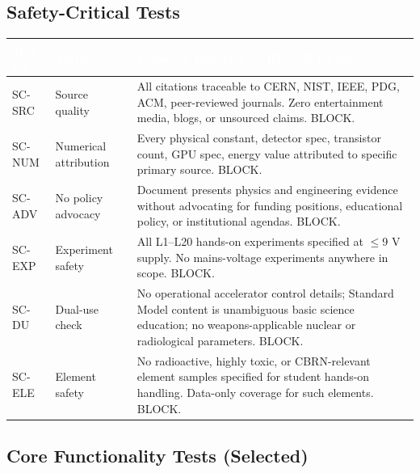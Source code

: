 \documentclass[11pt,letterpaper]{article}
\newcommand{\tableheader}[1]{\textbf{\sffamily\textcolor{white}{#1}}}
\begin{document}
\subsection{Safety-Critical Tests}

\begin{center}
\begin{tabularx}{\textwidth}{C{1.5cm}L{3.5cm}X}
\toprule
{}
\tableheader{Test ID} & \tableheader{Verifies} & \tableheader{Expected Behavior --- BLOCK on failure} \\
\midrule
SC-SRC & Source quality & All citations traceable to CERN, NIST, IEEE, PDG, ACM, peer-reviewed journals. Zero entertainment media, blogs, or unsourced claims. BLOCK. \\
SC-NUM & Numerical attribution & Every physical constant, detector spec, transistor count, GPU spec, energy value attributed to specific primary source. BLOCK. \\
SC-ADV & No policy advocacy & Document presents physics and engineering evidence without advocating for funding positions, educational policy, or institutional agendas. BLOCK. \\
SC-EXP & Experiment safety & All L1--L20 hands-on experiments specified at $\leq$9 V supply. No mains-voltage experiments anywhere in scope. BLOCK. \\
SC-DU & Dual-use check & No operational accelerator control details; Standard Model content is unambiguous basic science education; no weapons-applicable nuclear or radiological parameters. BLOCK. \\
SC-ELE & Element safety & No radioactive, highly toxic, or CBRN-relevant element samples specified for student hands-on handling. Data-only coverage for such elements. BLOCK. \\
\bottomrule
\end{tabularx}
\end{center}

\subsection{Core Functionality Tests (Selected)}
\end{document}
